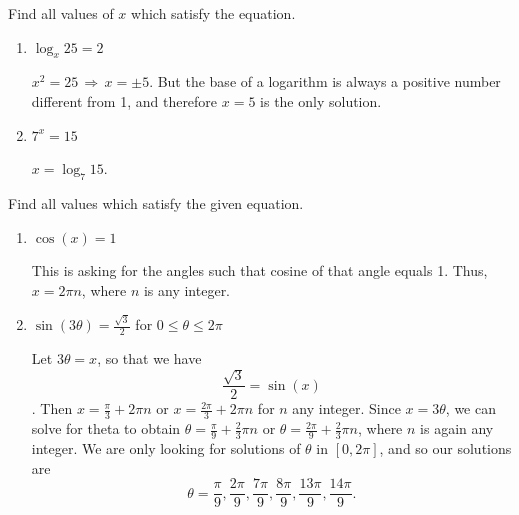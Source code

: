 \documentclass[nooutcomes]{ximera}
\begin{document}
\begin{problem}
Find all values of $x$ which satisfy the equation.
	
			\begin{enumerate}
			
			\item  $\log_x 25=2$ 
			
			 \begin{freeResponse}			 
			 $x^2 = 25 \, \Longrightarrow \, x = \pm 5$.  But the base of a logarithm is always a positive number different from 1, and therefore $x = 5$ is the only solution. 
			 \end{freeResponse}
			
			\item  $7^x=15$ 
			
			 \begin{freeResponse}			 
			 $x = \log_{7} 15$. 
			 \end{freeResponse}
			
			\end{enumerate}
			
\end{problem}
			
			

\begin{problem}
Find all values which satisfy the given equation.
	
			\begin{enumerate}
			
			\item  $\cos (x)=1$ 
			
			 \begin{freeResponse}			 
			 This is asking for the angles such that cosine of that angle equals 1.  Thus, $x = 2 \pi n$, where $n$ is any integer.  
			 \end{freeResponse}
			
			\item  $\sin (3 \theta )=\frac{\sqrt{3}}{2}$ for $0 \leq \theta \leq 2\pi $
			
			 \begin{freeResponse}			 
			 Let $3 \theta = x$, so that we have
			$$ \frac{\sqrt{3}}{2} = \sin(x) $$.
			Then $ x= \frac{\pi}{3} + 2 \pi n$ or $ x = \frac{2 \pi }{3} + 2 \pi n $ for $n$ any integer.  Since $x = 3 \theta$, we can solve for theta to obtain $ \theta = \frac{\pi}{9} + \frac{2}{3} \pi n $ or $ \theta = \frac{2 \pi }{9} + \frac{2}{3} \pi n $, where $n$ is again any integer.  We are only looking for solutions of $\theta$ in $[0, 2 \pi ]$, and so our solutions are
$$ \theta = \frac{\pi}{9}, \frac{2\pi}{9}, \frac{7\pi}{9}, \frac{8\pi}{9}, \frac{13\pi}{9}, \frac{14\pi}{9}. $$ 
			 \end{freeResponse}
			
			\end{enumerate}
			
\end{problem}
			
\end{document}

